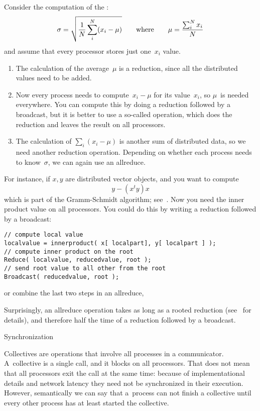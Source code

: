Consider the computation of the :
\[ \sigma = \sqrt{\frac1N \sum_i^N (x_i-\mu) }
\qquad\hbox{where}\qquad \mu = \frac{\sum_i^Nx_i}N
\]
and assume that every processor stores just one~$x_i$ value.
\begin{enumerate}
\item The calculation of the average~$\mu$ is a reduction, since all
  the distributed values need to be added.
\item Now every
  process needs to compute~$x_i-\mu$ for its value~$x_i$, so $\mu$~is
  needed everywhere. You can compute this by doing a reduction followed
  by a broadcast, but it is better to use a so-called
   operation, which does the reduction and leaves
  the result on all processors.
\item The calculation of $\sum_i(x_i-\mu)$ is another sum of
  distributed data, so we need another reduction operation. Depending
  on whether each process needs to know~$\sigma$, we can again use an
  allreduce.
\end{enumerate}

For instance, if $x,y$ are distributed vector objects, and you want to compute
\[ y- (x^ty)x \]
which is part of the Gramm-Schmidt algorithm; see~.
Now you need the inner product value on all processors. You could do this
by writing a reduction followed by a broadcast:
\begin{lstlisting}
// compute local value
localvalue = innerproduct( x[ localpart], y[ localpart ] );
// compute inner product on the root
Reduce( localvalue, reducedvalue, root );
// send root value to all other from the root
Broadcast( reducedvalue, root );
\end{lstlisting}
or combine the last two steps in an allreduce,

Surprisingly, an allreduce operation takes as
long as a rooted reduction (see~ for details),
and therefore half the time of a reduction followed by a broadcast.

 {Synchronization}

Collectives are operations that involve all processes in a
communicator. %
A~collective is a
single call, and it blocks on all processors.
That does not mean that
all processors exit the call at the same time: because of
implementational details and network
latency they need not be synchronized in their execution.
However, semantically we can say that
a~process can not finish
a collective until every other process has at least started the collective.


